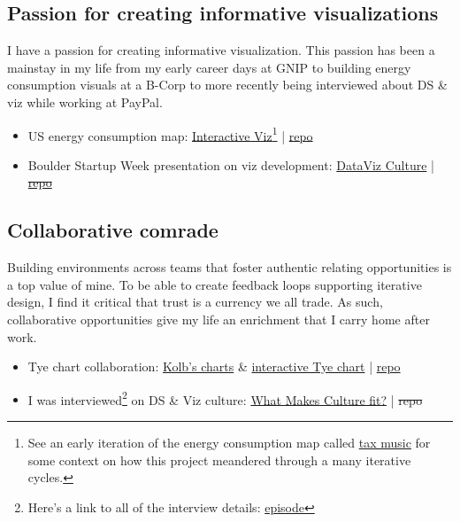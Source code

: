 \documentclass[11pt]{article}
\begin{document}
\subsection{Passion for creating informative visualizations}\label{sec:culture}
I have a passion for creating informative visualization. This passion has been a mainstay in my life from my early career days at GNIP to building energy consumption visuals at a B-Corp to more recently being interviewed about DS \& viz while working at PayPal. 

\begin{itemize}
	\item US energy consumption map:  \href{https://blehman.github.io/wmo_map/}{Interactive Viz}\footnote{See an early iteration of the energy consumption map called \href{https://blehman.github.io/tax_story/tax_sounds/}{tax music} for some context on how this project meandered through a many iterative cycles.} |  \href{https://github.com/blehman/wmo_map/tree/gh-pages}{repo} 
	\item Boulder Startup Week presentation on viz development:  \href{https://blehman.github.io/2015-05-13\_BSW\_DataViz\_Lecture/\#/}{DataViz Culture} | \sout{ \href{https://github.com/blehman/2015-05-13_BSW_DataViz_Lecture/tree/master}{repo} }
\end{itemize}


\subsection{Collaborative comrade}\label{sec:learner}
Building environments across teams that foster authentic relating opportunities is a top value of mine. To be able to create feedback loops supporting iterative design, I find it critical that trust is a currency we all trade. As such, collaborative opportunities give my life an enrichment that I carry home after work.  
 \begin{itemize}
 	\item Tye chart collaboration:  \href{https://github.com/twitterdev/Gnip-Trend-Detection}{Kolb's charts} \& \href{https://blehman.github.io/trend\_detection\_graph/}{interactive Tye chart} | \href{https://github.com/blehman/trend\_detection\_graph}{repo}
	\item I was interviewed\footnote{Here's a link to all of the interview details: \href{https://powderkeg.com/the-power-of-data-science-and-visualization-with-brian-lehman-of-honey/}{episode}} on DS \& Viz culture:  \href{https://www.youtube.com/watch?v=uIOiEL5aUe0&t=20m57s}{What Makes Culture fit?}  | \sout{repo}
 \end{itemize}
\end{document}
